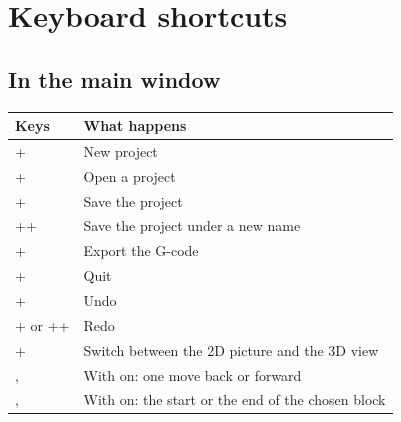 \chapter{Keyboard shortcuts}\label{ch:shortcuts}

\section{In the main window}
\begin{center}
\begin{tabularx}{0.9\textwidth}{@{}l Y@{}}
\toprule
\textbf{Keys} & \textbf{What happens} \\
\midrule
{}+ & New project \\
+ & Open a project \\
+ & Save the project \\
++ & Save the project under a new name \\
+ & Export the G-code \\
+ & Quit \\
+ & Undo \\
+ or ++ & Redo \\
+ & Switch between the 2D picture and the 3D view \\
,  & With  on: one move back or forward \\
,  & With  on: the start or the end of the chosen block \\
\bottomrule
\end{tabularx}
\end{center}

